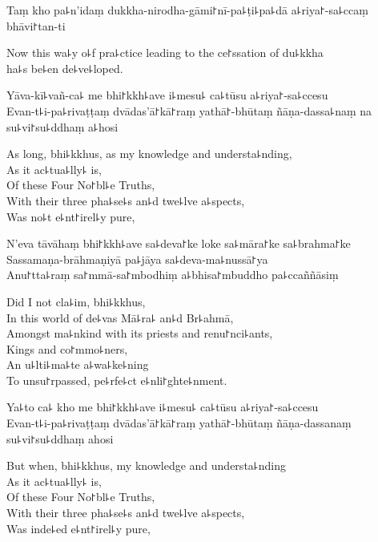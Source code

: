 Taṃ kho pa꜕n'idaṃ dukkha-nirodha-gāmi꜓nī-pa꜕ṭi꜕pa꜕dā a꜕riya꜓-sa꜕ccaṃ bhāvi꜓tan-ti

\begin{english}
  Now this wa꜕y o꜕f pra꜕ctice leading to the ce꜓ssation of du꜕kkha\\
  ha꜕s be꜕en de꜕ve꜕loped.
\end{english}

Yāva-kī꜕vañ-ca꜕ me bhi꜓kkh꜕ave i꜕mesu꜕ ca꜕tūsu a꜕riya꜓-sa꜕ccesu\\
Evan-t꜕i-pa꜕rivaṭṭaṃ dvādas'ā꜓kā꜓raṃ yathā꜓-bhūtaṃ ñāṇa-dassa꜕naṃ na su꜕vi꜓su꜕ddhaṃ a꜕hosi

\clearpage

\begin{english}
  As long, bhi꜕kkhus, as my knowledge and understa꜕nding,\\
  As it ac꜕tua꜕lly꜕ is,\\
  Of these Four No꜓bl꜕e Truths,\\
  With their three pha꜕se꜕s an꜕d twe꜕lve a꜕spects,\\
  Was no꜕t e꜕nt꜓irel꜕y pure,
\end{english}

N'eva tāvāhaṃ bhi꜓kkh꜕ave sa꜕deva꜓ke loke sa꜕māra꜓ke sa꜕brahma꜓ke\\
Sassamaṇa-brāhmaṇiyā pa꜕jāya sa꜕deva-ma꜕nussā꜓ya\\
Anu꜓tta꜕raṃ sa꜓mmā-sa꜓mbodhiṃ a꜕bhisa꜓mbuddho pa꜕ccaññāsiṃ

\begin{english}
  Did I not cla꜕im, bhi꜕kkhus,\\
  In this world of de꜕vas Mā꜕ra꜕ an꜕d Br꜕ahmā,\\
  Amongst ma꜕nkind with its priests and renu꜓nci꜕ants,\\
  Kings and co꜓mmo꜕ners,\\
  An u꜕lti꜕ma꜕te a꜕wa꜕ke꜕ning\\
  To unsu꜓rpassed, pe꜕rfe꜕ct e꜕nli꜓ghte꜕nment.
\end{english}

Ya꜕to ca꜕ kho me bhi꜓kkh꜕ave i꜕mesu꜕ ca꜕tūsu a꜕riya꜓-sa꜕ccesu\\
Evan-t꜕i-pa꜕rivaṭṭaṃ dvādas'ā꜓kā꜓raṃ yathā꜓-bhūtaṃ ñāṇa-dassanaṃ su꜕vi꜓su꜕ddhaṃ ahosi

\begin{english}
  But when, bhi꜕kkhus, my knowledge and understa꜕nding\\
  As it ac꜕tua꜕lly꜕ is,\\
  Of these Four No꜓bl꜕e Truths,\\
  With their three pha꜕se꜕s an꜕d twe꜕lve a꜕spects,\\
  Was inde꜕ed e꜕nt꜓irel꜕y pure,
\end{english}

